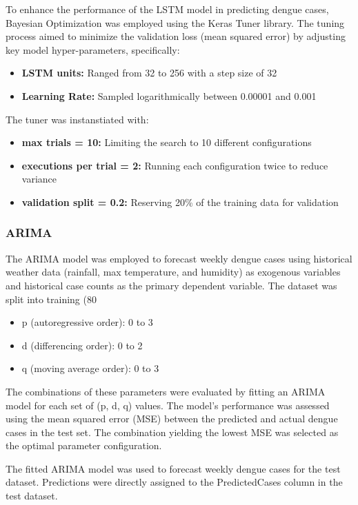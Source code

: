 To enhance the performance of the LSTM model in predicting dengue cases, Bayesian Optimization was employed using the Keras Tuner library. The tuning process aimed to minimize the validation loss (mean squared error) by adjusting key model hyper-parameters, specifically:

\begin{itemize}
	\item \textbf{LSTM units:} Ranged from 32 to 256 with a step size of 32
	\item \textbf{Learning Rate:} Sampled logarithmically between 0.00001 and 0.001
\end{itemize}

The tuner was instanstiated with:
\begin{itemize}
	\item \textbf{max trials = 10:} Limiting the search to 10 different configurations
	\item \textbf{executions per trial = 2:} Running each configuration twice to reduce variance
	\item \textbf{validation split = 0.2:} Reserving 20\% of the training data for validation
\end{itemize}


\subsubsection{ARIMA}
The ARIMA model was employed to forecast weekly dengue cases using historical weather data (rainfall, max temperature, and humidity) as exogenous variables and historical case counts as the primary dependent variable.
The dataset was split into training (80%
\begin{itemize}
	\item p (autoregressive order): 0 to 3
	\item d (differencing order): 0 to 2
	\item q (moving average order): 0 to 3
\end{itemize}
The combinations of these parameters were evaluated by fitting an ARIMA model for each set of (p, d, q) values. The model's performance was assessed using the mean squared error (MSE) between the predicted and actual dengue cases in the test set. The combination yielding the lowest MSE was selected as the optimal parameter configuration.

The fitted ARIMA model was used to forecast weekly dengue cases for the test dataset. Predictions were directly assigned to the PredictedCases column in the test dataset.

